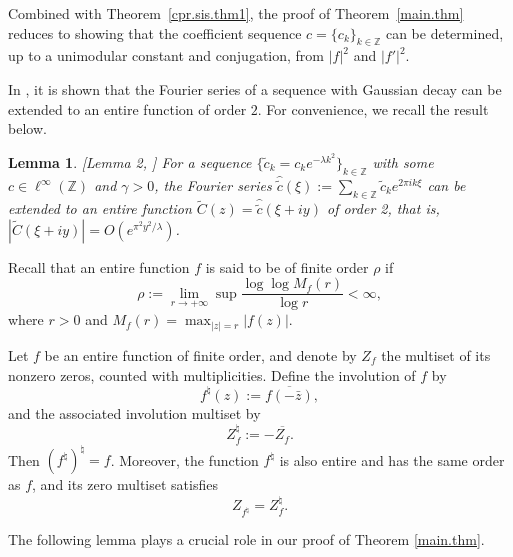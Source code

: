 \documentclass[11pt,oneside,reqno]{amsart}
\newtheorem{lem}[thm]{Lemma}
\numberwithin{equation}{section}
\def\C{ {\mathbb C} }
\def\Z{ {\mathbb Z} }
\begin{document}
Combined with Theorem~\ref{cpr.sis.thm1}, the proof of Theorem~\ref{main.thm} reduces to showing that the coefficient sequence $c=\{c_k\}_{k\in\Z}$ can be determined, up to a unimodular constant and conjugation, from $|f|^2$ and $|f'|^2$.

\smallskip 
In \cite{grochenig2020}, it is shown that the Fourier series of a sequence with Gaussian decay can be extended to an entire function of order $2$. For convenience, we recall the result below.

\begin{lem}\label{extension.lem}{\rm [Lemma 2, \cite{grochenig2020}]}
{\rm For a sequence $\{{\tilde c}_k=c_ke^{-\lambda k^2}\}_{k\in \Z}$ with some $c\in \ell^\infty(\Z)$ and $\gamma>0$,  the Fourier series $\hat {\tilde c}(\xi):=\sum_{k\in \Z}{\tilde c}_k e^{2\pi ik\xi}$ can be extended to an entire function $\tilde C(z) =\hat {\tilde c}(\xi+iy)$ of order 2, that is, $|\tilde C(\xi+iy)|=O(e^{\pi^2y^2/\lambda})$.}
\end{lem}

Recall that an entire function $f$ is said to be of finite order $\rho$ if 
\begin{equation*}
\rho:=\lim_{r \to +\infty}\sup\frac{\log\log M_{f}(r)}{\log r}<\infty,
\end{equation*}
where $r>0$ and $M_{f}(r)=\max_{|z|=r}|f(z)|$.




Let $f$ be an entire function of finite order, and denote by $Z_f$ the multiset
of its nonzero zeros, counted with multiplicities. Define the involution of $f$
by
\[
f^\natural(z) := \overline{f(-\bar z)},
\]
and the associated involution multiset by
\[
Z_f^\natural := -\overline{Z_f}.
\]
Then $(f^\natural)^\natural = f$. Moreover, the function $f^\natural$ is also
entire and has the same order as $f$, and its zero multiset satisfies
\[
Z_{f^\natural} = Z_f^\natural.
\]


The following lemma plays a crucial role  in our proof of Theorem \ref{main.thm}.

\end{document}
